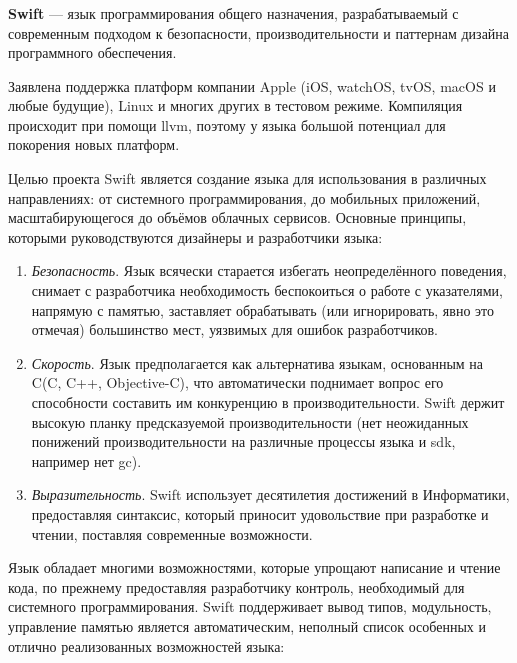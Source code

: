 \subsubsection{}
\label{sec:development:arch:ios:swift}

\textbf{Swift} --- язык программирования общего назначения, разрабатываемый с современным подходом к безопасности, производительности и паттернам дизайна программного обеспечения\cite{swift:about}. 

Заявлена поддержка платформ компании Apple (iOS, watchOS, tvOS, macOS и любые будущие), Linux и многих других в тестовом режиме. Компиляция происходит при помощи \gls{llvm}, поэтому у языка большой потенциал для покорения новых платформ.

Целью проекта Swift является создание языка для использования в различных направлениях: от системного программирования, до мобильных приложений, масштабирующегося до объёмов облачных сервисов. Основные принципы, которыми руководствуются дизайнеры и разработчики языка:

\begin{enumerate}
	\item \emph{Безопасность}. Язык всячески старается избегать неопределённого поведения, снимает с разработчика необходимость беспокоиться о работе с указателями, напрямую с памятью, заставляет обрабатывать (или игнорировать, явно это отмечая) большинство мест, уязвимых для ошибок разработчиков.
	\item \emph{Скорость}. Язык предполагается как альтернатива языкам, основанным на C(C, C++, Objective-C), что автоматически поднимает вопрос его способности составить им конкуренцию в производительности. Swift держит высокую планку предсказуемой производительности (нет неожиданных понижений производительности на различные процессы языка и \gls{sdk}, например нет \gls{gc}).
	\item \emph{Выразительность}. Swift использует десятилетия достижений в Информатики, предоставляя синтаксис, который приносит удовольствие при разработке и чтении, поставляя современные возможности.  
\end{enumerate}

Язык обладает многими возможностями, которые упрощают написание и чтение кода, по прежнему предоставляя разработчику контроль, необходимый для системного программирования. Swift поддерживает вывод типов, модульность, управление памятью является автоматическим, неполный список особенных и отлично реализованных возможностей языка:

